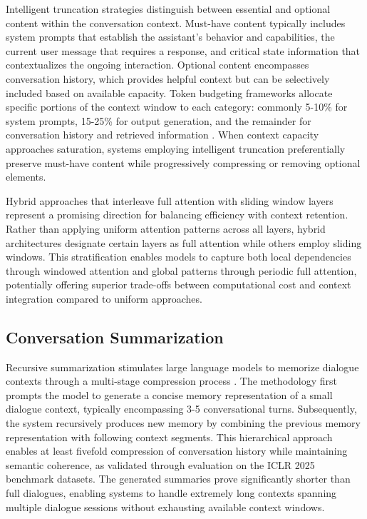 \documentclass[11pt,letterpaper]{article}
\begin{document}
Intelligent truncation strategies distinguish between essential and optional content within the conversation context. Must-have content typically includes system prompts that establish the assistant's behavior and capabilities, the current user message that requires a response, and critical state information that contextualizes the ongoing interaction. Optional content encompasses conversation history, which provides helpful context but can be selectively included based on available capacity. Token budgeting frameworks allocate specific portions of the context window to each category: commonly 5-10\% for system prompts, 15-25\% for output generation, and the remainder for conversation history and retrieved information \cite{alsalboukh2024strategies}. When context capacity approaches saturation, systems employing intelligent truncation preferentially preserve must-have content while progressively compressing or removing optional elements.

Hybrid approaches that interleave full attention with sliding window layers represent a promising direction for balancing efficiency with context retention. Rather than applying uniform attention patterns across all layers, hybrid architectures designate certain layers as full attention while others employ sliding windows. This stratification enables models to capture both local dependencies through windowed attention and global patterns through periodic full attention, potentially offering superior trade-offs between computational cost and context integration compared to uniform approaches.

\subsection{Conversation Summarization}

Recursive summarization stimulates large language models to memorize dialogue contexts through a multi-stage compression process \cite{wu2023recursively}. The methodology first prompts the model to generate a concise memory representation of a small dialogue context, typically encompassing 3-5 conversational turns. Subsequently, the system recursively produces new memory by combining the previous memory representation with following context segments. This hierarchical approach enables at least fivefold compression of conversation history while maintaining semantic coherence, as validated through evaluation on the ICLR 2025 benchmark datasets. The generated summaries prove significantly shorter than full dialogues, enabling systems to handle extremely long contexts spanning multiple dialogue sessions without exhausting available context windows.
\end{document}
